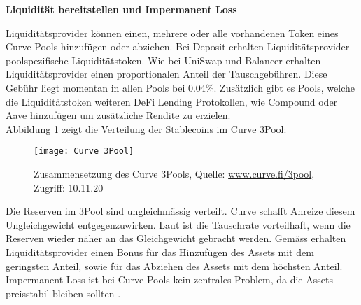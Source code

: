 \documentclass[12pt,a4paper,titlepage,oneside,english]{article}
\begin{document}
\textbf{Liquidität bereitstellen und Impermanent Loss}

Liquiditätsprovider können einen, mehrere oder alle vorhandenen Token eines Curve-Pools hinzufügen oder abziehen. Bei Deposit erhalten Liquiditätsprovider poolspezifische Liquiditätstoken.
Wie bei UniSwap und Balancer erhalten Liquiditätsprovider einen proportionalen Anteil der Tauschgebühren. Diese Gebühr liegt momentan in allen Pools bei 0.04\%. Zusätzlich gibt es Pools, welche die Liquiditätstoken weiteren DeFi Lending Protokollen, wie Compound oder Aave hinzufügen um zusätzliche Rendite zu erzielen. \citep[vgl.][]{charlie2020} \\
Abbildung \ref{fig:Pool} zeigt die Verteilung der Stablecoins im Curve 3Pool:\\

\begin{figure}[h!]
\begin{center}
\texttt{[image: Curve 3Pool]}
\caption{Zusammensetzung des Curve 3Pools, Quelle: \url{www.curve.fi/3pool}, Zugriff: 10.11.20} \label{fig:Pool}
\end{center}
\end{figure} 

Die Reserven im 3Pool sind ungleichmässig verteilt. 
Curve schafft Anreize diesem Ungleichgewicht entgegenzuwirken. Laut \cite{Zhang2020} ist die Tauschrate vorteilhaft, wenn die Reserven wieder näher an das Gleichgewicht gebracht werden. Gemäss \cite{charlie2020} erhalten Liquiditätsprovider einen Bonus für das Hinzufügen des Assets mit dem geringsten Anteil, sowie für das Abziehen des Assets mit dem höchsten Anteil.\\
Impermanent Loss ist bei Curve-Pools kein zentrales Problem, da die Assets preisstabil bleiben sollten \citep{Reimi2020}.
\end{document}
